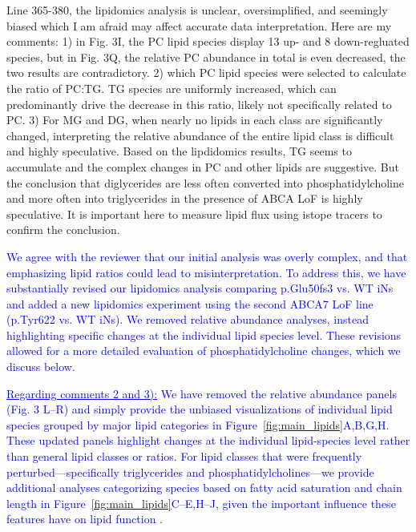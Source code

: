 Line 365-380, the lipidomics analysis is unclear, oversimplified, and seemingly biased which I am afraid may affect accurate data interpretation. Here are my comments: 1) in Fig. 3I, the PC lipid species display 13 up- and 8 down-regluated species, but in Fig. 3Q, the relative PC abundance in total is even decreased, the two results are contradictory. 2) which PC lipid species were selected to calculate the ratio of PC:TG. TG species are uniformly increased, which can predominantly drive the decrease in this ratio, likely not specifically related to PC. 3) For MG and DG, when nearly no lipids in each class are significantly changed, interpreting the relative abundance of the entire lipid class is difficult and highly speculative. Based on the lipdidomics results, TG seems to accumulate and the complex changes in PC and other lipids are suggestive. But the conclusion that diglycerides are less often converted into phosphatidylcholine and more often into triglycerides in the presence of ABCA LoF is highly speculative. It is important here to measure lipid flux using istope tracers to confirm the conclusion.

\textcolor{blue}{We agree with the reviewer that our initial analysis was overly complex, and that emphasizing lipid ratios could lead to misinterpretation. To address this, we have substantially revised our lipidomics analysis comparing p.Glu50fs3 vs. WT iNs and added a new lipidomics experiment using the second ABCA7 LoF line (p.Tyr622 vs. WT iNs). We removed relative abundance analyses, instead highlighting specific changes at the individual lipid species level. These revisions allowed for a more detailed evaluation of phosphatidylcholine changes, which we discuss below.}

\textcolor{blue}{\underline{Regarding comments 2 and 3):} We have removed the relative abundance panels (Fig. 3 L–R) and simply provide the unbiased visualizations of individual lipid species grouped by major lipid categories in Figure~\ref{fig:main_lipids}A,B,G,H. These updated panels highlight changes at the individual lipid-species level rather than general lipid classes or ratios. For lipid classes that were frequently perturbed—specifically triglycerides and phosphatidylcholines—we provide additional analyses categorizing species based on fatty acid saturation and chain length in Figure~\ref{fig:main_lipids}C–E,H–J, given the important influence these features have on lipid function \cite{Wang2019-om}}.	

